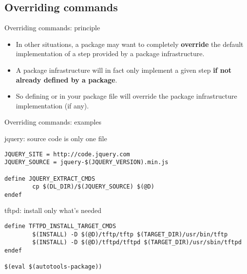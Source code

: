 \subsection{Overriding commands}

\begin{frame}{Overriding commands: principle}

  \begin{itemize}
  \item In other situations, a package may want to completely {\bf
      override} the default implementation of a step provided by a
    package infrastructure.

  \item A package infrastructure will in fact only implement a given
    step {\bf if not already defined by a package}.

  \item So defining  or
     in your package  file will
    override the package infrastructure implementation (if any).

  \end{itemize}

\end{frame}

\begin{frame}[fragile]{Overriding commands: examples}

\begin{block}{jquery: source code is only one file}
\begin{verbatim}
JQUERY_SITE = http://code.jquery.com
JQUERY_SOURCE = jquery-$(JQUERY_VERSION).min.js

define JQUERY_EXTRACT_CMDS
        cp $(DL_DIR)/$(JQUERY_SOURCE) $(@D)
endef
\end{verbatim}
\end{block}

\begin{block}{tftpd: install only what's needed}
\begin{verbatim}
define TFTPD_INSTALL_TARGET_CMDS
        $(INSTALL) -D $(@D)/tftp/tftp $(TARGET_DIR)/usr/bin/tftp
        $(INSTALL) -D $(@D)/tftpd/tftpd $(TARGET_DIR)/usr/sbin/tftpd
endef

$(eval $(autotools-package))
\end{verbatim}
\end{block}

\end{frame}

